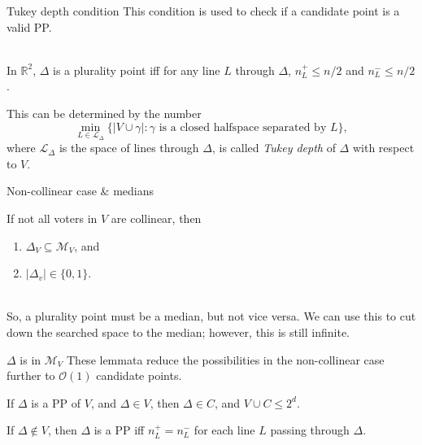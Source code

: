 \documentclass{beamer}
\newcommand{\RR}{\mathbb{R}}
\newcommand{\order}[1]{\ensuremath{\mathcal{O}(#1)}}
\newcommand{\eqspacing}[2]{%
  \setlength\abovedisplayskip{#1}%
  \setlength\belowdisplayskip{#2}%
}
\begin{document}
\begin{frame}{Tukey depth condition}
  This condition is used to check if a candidate point is a valid PP. \\~\\
  
  \begin{lemma}[]  %
    In \(\RR^2\), \(\Delta\) is a plurality point iff for any line \(L\) through \(\Delta\), \(n^+_L
    \leq n/2\) and \(n^-_L \leq n/2\). 
  \end{lemma}
  \eqspacing{1ex}{1ex}
  This can be determined by the number
  \begin{equation*}
    \min_{L \in \mathcal{L}_{\Delta}} \{\lvert V \cup \gamma \rvert : \text{\(\gamma\) is a closed halfspace
      separated by \(L\)}\},
  \end{equation*}
  where \(\mathcal{L}_{\Delta}\) is the space of lines through \(\Delta\), is called \textit{Tukey
    depth} of \(\Delta\) with respect to \(V\).
\end{frame}


\begin{frame}{Non-collinear case \& medians}
  \begin{lemma}  %
    If not all voters in \(V\) are collinear, then
    \begin{enumerate}
    \item \(\Delta_V \subseteq \mathcal{M}_V\), and
    \item \(\lvert\Delta_{v}\rvert \in \{0, 1\}\).
    \end{enumerate}
  \end{lemma} ~\\
  So, a plurality point must be a median, but not vice versa.  We can use this to cut down the
  searched space to the median; however, this is still infinite.
\end{frame}


\begin{frame}{\(\Delta\) is in \(\mathcal{M}_V\)}
  These lemmata reduce the possibilities in the non-collinear case further to \order{1} candidate
  points.
  \begin{lemma}[\(\Delta \in V\)]  %
    If \(\Delta\) is a PP of \(V\), and \(\Delta \in V\), then \(\Delta \in C\), and
    \(V \cup C \leq 2^d\).
  \end{lemma}
  \begin{lemma} %
    If \(\Delta \not\in V\), then \(\Delta\) is a PP iff \(n^+_L = n^-_L\) for each line \(L\) passing
    through \(\Delta\). 
  \end{lemma}
\end{frame}
\end{document}
